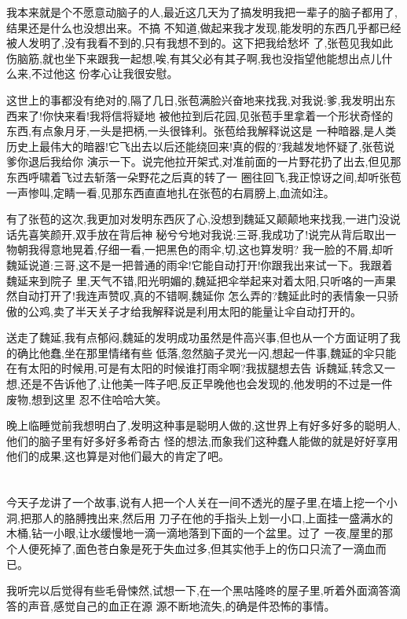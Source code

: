 ﻿\documentclass[12pt,twocolumn]{article}
\begin{document}
我本来就是个不愿意动脑子的人,最近这几天为了搞发明我把一辈子的脑子都用了,结果还是什么也没想出来。不搞
不知道,做起来我才发现,能发明的东西几乎都已经被人发明了,没有我看不到的,只有我想不到的。这下把我给愁坏
了,张苞见我如此伤脑筋,就也坐下来跟我一起想,唉,有其父必有其子啊,我也没指望他能想出点儿什么来,不过他这
份孝心让我很安慰。

这世上的事都没有绝对的,隔了几日,张苞满脸兴奋地来找我,对我说:爹,我发明出东西来了!你快来看!我将信将疑地
被他拉到后花园,见张苞手里拿着一个形状奇怪的东西,有点象月牙,一头是把柄,一头很锋利。张苞给我解释说这是
一种暗器,是人类历史上最伟大的暗器!它飞出去以后还能绕回来!真的假的?我越发地怀疑了,张苞说爹你退后我给你
演示一下。说完他拉开架式,对准前面的一片野花扔了出去,但见那东西呼啸着飞过去斩落一朵野花之后真的转了一
圈往回飞,我正惊讶之间,却听张苞一声惨叫,定睛一看,见那东西直直地扎在张苞的右肩膀上,血流如注。

有了张苞的这次,我更加对发明东西灰了心,没想到魏延又颠颠地来找我,一进门没说话先喜笑颜开,双手放在背后神
秘兮兮地对我说:三哥,我成功了!说完从背后取出一物朝我得意地晃着,仔细一看,一把黑色的雨伞,切,这也算发明?
我一脸的不屑,却听魏延说道:三哥,这不是一把普通的雨伞!它能自动打开!你跟我出来试一下。我跟着魏延来到院子
里,天气不错,阳光明媚的,魏延把伞举起来对着太阳,只听咯的一声果然自动打开了!我连声赞叹,真的不错啊,魏延你
怎么弄的?魏延此时的表情象一只骄傲的公鸡,卖了半天关子才给我解释说是利用太阳的能量让伞自动打开的。

送走了魏延,我有点郁闷,魏延的发明成功虽然是件高兴事,但也从一个方面证明了我的确比他蠢,坐在那里情绪有些
低落,忽然脑子灵光一闪,想起一件事,魏延的伞只能在有太阳的时候用,可是有太阳的时候谁打雨伞啊?我拔腿想去告
诉魏延,转念又一想,还是不告诉他了,让他美一阵子吧,反正早晚他也会发现的,他发明的不过是一件废物,想到这里
忍不住哈哈大笑。

晚上临睡觉前我想明白了,发明这种事是聪明人做的,这世界上有好多好多的聪明人,他们的脑子里有好多好多希奇古
怪的想法,而象我们这种蠢人能做的就是好好享用他们的成果,这也算是对他们最大的肯定了吧。

\section{}

今天子龙讲了一个故事,说有人把一个人关在一间不透光的屋子里,在墙上挖一个小洞,把那人的胳膊拽出来,然后用
刀子在他的手指头上划一小口,上面挂一盛满水的木桶,钻一小眼,让水缓慢地一滴一滴地落到下面的一个盆里。过了
一夜,屋里的那个人便死掉了,面色苍白象是死于失血过多,但其实他手上的伤口只流了一滴血而已。

我听完以后觉得有些毛骨悚然,试想一下,在一个黑咕隆咚的屋子里,听着外面滴答滴答的声音,感觉自己的血正在源
源不断地流失,的确是件恐怖的事情。
\end{document}
